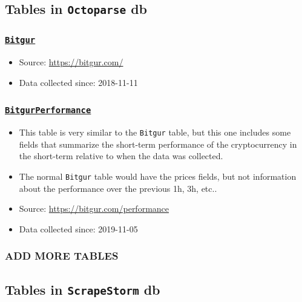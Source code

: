 \documentclass[]{book}
\begin{document}
\hypertarget{tables-in-octoparse-db}{%
\subsection{\texorpdfstring{Tables in \texttt{Octoparse} db}{Tables in Octoparse db}}\label{tables-in-octoparse-db}}

\hypertarget{bitgur}{%
\subsubsection{\texorpdfstring{\href{https://predictcryptodb.com/question/6}{\textbf{\texttt{Bitgur}}}}{Bitgur}}\label{bitgur}}

\begin{itemize}
\item
  Source: \url{https://bitgur.com/}
\item
  Data collected since: 2018-11-11
\end{itemize}

\hypertarget{bitgurperformance}{%
\subsubsection{\texorpdfstring{\href{https://predictcryptodb.com/question/7}{\textbf{\texttt{BitgurPerformance}}}}{BitgurPerformance}}\label{bitgurperformance}}

\begin{itemize}
\item
  This table is very similar to the \texttt{Bitgur} table, but this one includes some fields that summarize the short-term performance of the cryptocurrency in the short-term relative to when the data was collected.
\item
  The normal \texttt{Bitgur} table would have the prices fields, but not information about the performance over the previous 1h, 3h, etc..
\item
  Source: \url{https://bitgur.com/performance}
\item
  Data collected since: 2019-11-05
\end{itemize}

\hypertarget{add-more-tables}{%
\subsubsection{ADD MORE TABLES}\label{add-more-tables}}

\hypertarget{tables-in-scrapestorm-db}{%
\subsection{\texorpdfstring{Tables in \texttt{ScrapeStorm} db}{Tables in ScrapeStorm db}}\label{tables-in-scrapestorm-db}}
\end{document}
